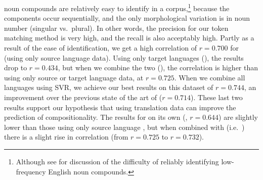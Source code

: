 \documentclass[output=paper
,modfonts
,nonflat]{langsci/langscibook}
\begin{document}
 noun compounds are relatively easy to identify in a
corpus,\footnote{Although see \citet{Lapata:2003} for discussion of
  the difficulty of reliably identifying low-frequency English noun
  compounds.} because the components occur sequentially, and the only
morphological variation is in noun number (singular vs.\ plural). In
other words, the precision for our token matching method is very high,
and the recall is also acceptably high. Partly as a result of the ease
of identification, we get a high correlation of $r = 0.700$ for
\CSsource (using only source language data). Using only target
languages (\CStarg), the results drop to $r = 0.434$, but when we
combine the two (\CSsourcetarg), the correlation is higher than using
only source or target language data, at $r = 0.725$. When we combine
all languages using SVR, we achieve our best results on this dataset
of $r = 0.744$, an improvement over the previous state of the art of
\citet{reddy2011a} ($r = 0.714$). These last two results support our
hypothesis that using translation data can improve the prediction of
compositionality. The results for  on its own
(\CSstring, $r = 0.644$) are slightly lower than those using only
source language , but when combined with
\CSsourcetarg (i.e.\ \CSall) there is a slight rise in correlation
(from $r = 0.725$ to $r = 0.732$).




\end{document}

